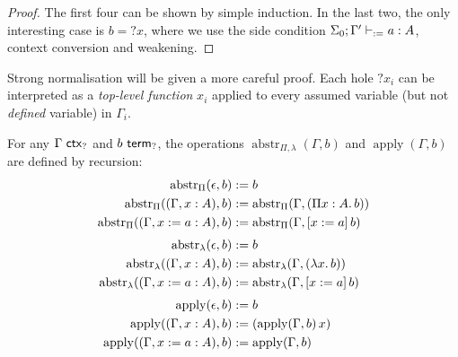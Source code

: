 \documentclass[twoside]{report}
\begin{document}
\begin{proof}
    The first four can be shown by simple induction. In the last two, the only interesting case is $b = {?x}$, where we use the side condition $\Sigma_0; \Gamma' \vdash_{:=} a : A$, context conversion and weakening.
\end{proof}

Strong normalisation will be given a more careful proof. Each hole $?x_i$ can be interpreted as a \emph{top-level function} $x_i$ applied to every assumed variable (but not \emph{defined} variable) in $\Gamma_i$.

\newcommand{\abstr}{\operatorname{abstr}}
\newcommand{\apply}{\operatorname{apply}}

\begin{definition}
    \label{def:context_environment_abstr_apply}
    For any $\Gamma \ \mathsf{ctx}_{?}$ and $b \ \mathsf{term}_{?}$, the operations $\abstr_{\Pi,\lambda}(\Gamma, b)$ and $\apply(\Gamma, b)$ are defined by recursion:
    $$
        \begin{aligned}
            \abstr_\Pi(\epsilon, b)                     & \defeq b                                   \\
            \abstr_\Pi((\Gamma, x : A), b)              & \defeq \abstr_\Pi(\Gamma, (\ppi x A b))    \\
            \abstr_\Pi((\Gamma, x \defeq a : A), b)     & \defeq \abstr_\Pi(\Gamma, \llet x a b)     \\[0.3em]
            \abstr_\lambda(\epsilon, b)                 & \defeq b                                   \\
            \abstr_\lambda((\Gamma, x : A), b)          & \defeq \abstr_\lambda(\Gamma, (\lam x b))  \\
            \abstr_\lambda((\Gamma, x \defeq a : A), b) & \defeq \abstr_\lambda(\Gamma, \llet x a b) \\[0.3em]
            \apply(\epsilon, b)                         & \defeq b                                   \\
            \apply((\Gamma, x : A), b)                  & \defeq (\app {\apply(\Gamma, b)} x)        \\
            \apply((\Gamma, x \defeq a : A), b)         & \defeq \apply(\Gamma, b)                   \\
        \end{aligned}
    $$
\end{definition}

\end{document}
